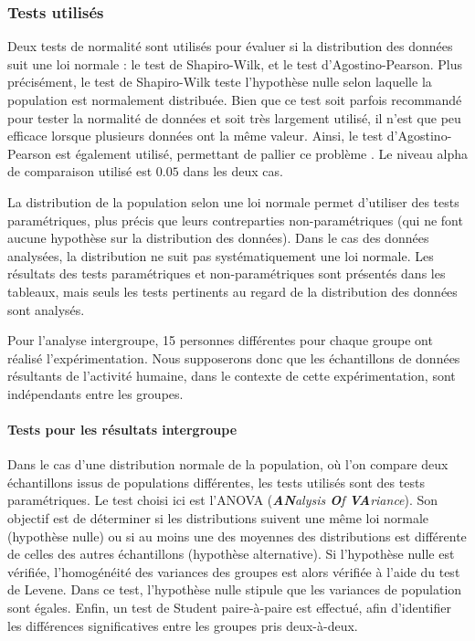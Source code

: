 \subsubsection{Tests utilisés}

Deux tests de normalité sont utilisés pour évaluer si la distribution des données suit une loi normale : le test de Shapiro-Wilk, et le test d'Agostino-Pearson. Plus précisément, le test de Shapiro-Wilk teste l'hypothèse nulle selon laquelle la population est normalement distribuée. Bien que ce test soit parfois recommandé pour tester la normalité de données \parencite{Thode2002Tfn} et soit très largement utilisé, il n'est que peu efficace lorsque plusieurs données ont la même valeur. Ainsi, le test d'Agostino-Pearson est également utilisé, permettant de pallier ce problème \parencite{DAgostino1990ASf}.
Le niveau alpha de comparaison utilisé est $0.05$ dans les deux cas.

La distribution de la population selon une loi normale permet d'utiliser des tests paramétriques, plus précis que leurs contreparties non-paramétriques (qui ne font aucune hypothèse sur la distribution des données). Dans le cas des données analysées, la distribution ne suit pas systématiquement une loi normale. Les résultats des tests paramétriques et non-paramétriques sont présentés dans les tableaux, mais seuls les tests pertinents au regard de la distribution des données sont analysés.

Pour l'analyse intergroupe, 15 personnes différentes pour chaque groupe ont réalisé l'expérimentation. Nous supposerons donc que les échantillons de données résultants de l'activité humaine, dans le contexte de cette expérimentation, sont indépendants entre les groupes.

\paragraph{Tests pour les résultats intergroupe}
Dans le cas d'une distribution normale de la population, où l'on compare deux échantillons issus de populations différentes, les tests utilisés sont des tests paramétriques. Le test choisi ici est l'ANOVA (\textit{\textbf{AN}alysis \textbf{O}f \textbf{VA}riance}). Son objectif est de déterminer si les distributions suivent une même loi normale (hypothèse nulle) ou si au moins une des moyennes des distributions est différente de celles des autres échantillons (hypothèse alternative). Si l'hypothèse nulle est vérifiée, l'homogénéité des variances des groupes est alors vérifiée à l'aide du test de Levene. Dans ce test, l'hypothèse nulle stipule que les variances de population sont égales. Enfin, un test de Student paire-à-paire est effectué, afin d'identifier les différences significatives entre les groupes pris deux-à-deux.\\


